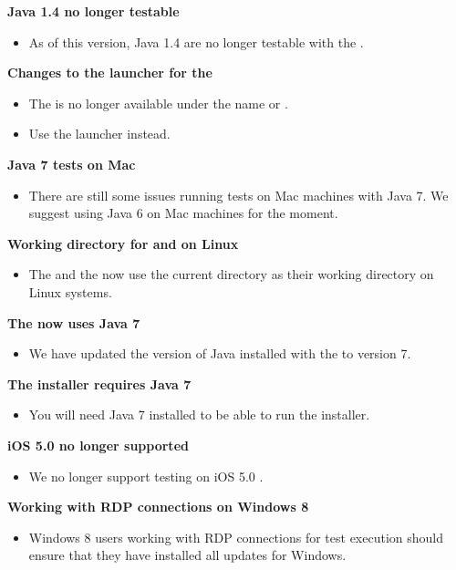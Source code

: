 \textbf{Java 1.4 \gdauts{} no longer testable}
\begin{itemize}
\item As of this version, Java 1.4 \gdauts{} are no longer testable with the \ite{}. 
\end{itemize}

\textbf{Changes to the launcher for the \gdagent{}}
\begin{itemize}
\item The \gdagent{} is no longer available under the name  or .
\item Use the launcher  instead.
\end{itemize}

\textbf{Java 7 tests on Mac}
\begin{itemize}
\item There are still some issues running tests on Mac machines with Java 7. We suggest using Java 6 on Mac machines for the moment.
\end{itemize}

\textbf{Working directory for \ite{} and \gdagent{} on Linux}
\begin{itemize}
\item The \gdagent{} and the \ite{} now  use the current directory as their working directory on Linux systems.
\end{itemize}


\textbf{The \ite{} now uses Java 7}
\begin{itemize}
\item We have updated the version of Java installed with the \ite{} to version 7.
\end{itemize}

\textbf{The installer requires Java 7}
\begin{itemize}
\item You will need Java 7 installed to be able to run the installer.
\end{itemize}

\textbf{iOS 5.0 no longer supported}
\begin{itemize}
\item We no longer support testing on iOS 5.0 \gdauts{}.
\end{itemize}

\textbf{Working with RDP connections on Windows 8}
\begin{itemize}
\item Windows 8 users working with RDP connections for test execution should ensure that they have installed all updates for Windows. 
\end{itemize}

